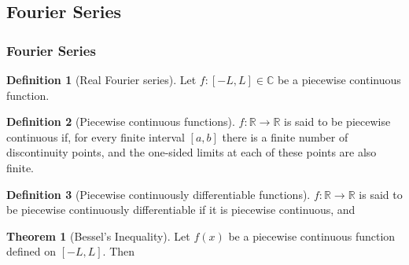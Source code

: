 \documentclass[fleqn, 8pt]{amsart}
\theoremstyle{definition}
\newtheorem{definition}{Definition}
\theoremstyle{theorem}
\newtheorem{theorem}{Theorem}
\begin{document}
\begin{multicols}{2}

\begin{spacing}{0.7}

\part{Fourier Series}

\section{Fourier Series}

\begin{definition}[Real Fourier series]
	Let $f : [-L,L] \in \mathbb{C}$ be a piecewise continuous function.
\end{definition}

\begin{definition}[Piecewise continuous functions]
	$f : \mathbb{R} \to \mathbb{R}$ is said to be piecewise continuous if, for every finite interval $[a,b]$ there is a finite number of discontinuity points, and the one-sided limits at each of these points are also finite.
\end{definition}

\begin{definition}[Piecewise continuously differentiable functions]
	$f : \mathbb{R} \to \mathbb{R}$ is said to be piecewise continuously differentiable if it is piecewise continuous, and
\end{definition}

\begin{theorem}[Bessel's Inequality]
	Let $f(x)$ be a piecewise continuous function defined on $[-L,L]$.
	Then
	\label{Bessel's_Inequality}
\end{theorem}


\end{spacing}
\end{multicols}
\end{document}
